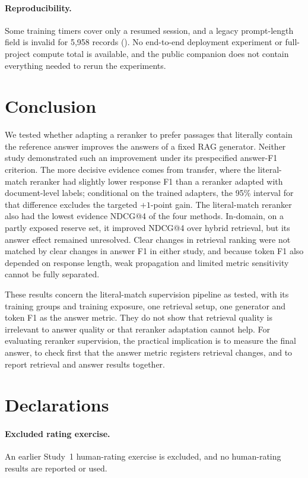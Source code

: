 \paragraph{Reproducibility.} Some training timers cover only a resumed session, and a legacy prompt-length field is invalid for 5,958 records (). No end-to-end deployment experiment or full-project compute total is available, and the public companion does not contain everything needed to rerun the experiments.

\section{Conclusion}
We tested whether adapting a reranker to prefer passages that literally contain the reference answer improves the answers of a fixed RAG generator. Neither study demonstrated such an improvement under its prespecified answer-F1 criterion. The more decisive evidence comes from transfer, where the literal-match reranker had slightly lower response F1 than a reranker adapted with document-level labels; conditional on the trained adapters, the 95\% interval for that difference excludes the targeted $+1$-point gain. The literal-match reranker also had the lowest evidence NDCG@4 of the four methods. In-domain, on a partly exposed reserve set, it improved NDCG@4 over hybrid retrieval, but its answer effect remained unresolved. Clear changes in retrieval ranking were not matched by clear changes in answer F1 in either study, and because token F1 also depended on response length, weak propagation and limited metric sensitivity cannot be fully separated.

These results concern the literal-match supervision pipeline as tested, with its training groups and training exposure, one retrieval setup, one generator and token F1 as the answer metric. They do not show that retrieval quality is irrelevant to answer quality or that reranker adaptation cannot help. For evaluating reranker supervision, the practical implication is to measure the final answer, to check first that the answer metric registers retrieval changes, and to report retrieval and answer results together.

\section*{Declarations}
\paragraph{Excluded rating exercise.} An earlier Study~1 human-rating exercise is excluded, and no human-rating results are reported or used.
